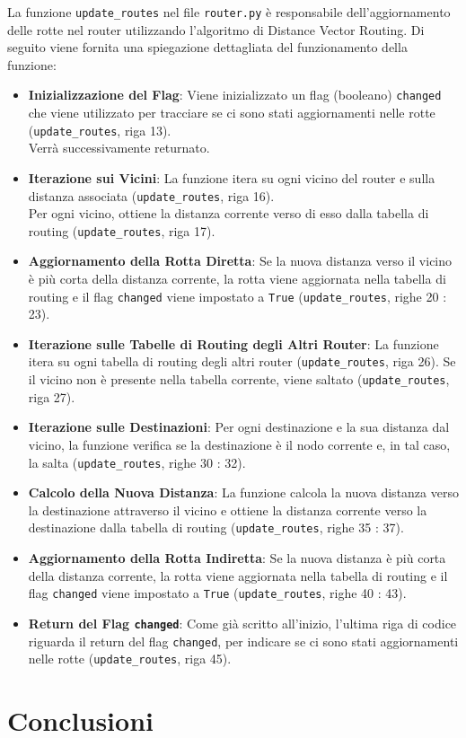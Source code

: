 \documentclass[a4paper,12pt]{report}
\begin{document}
La funzione \texttt{update\_routes} nel file \texttt{router.py} è responsabile dell'aggiornamento delle rotte nel router utilizzando l'algoritmo di Distance Vector Routing.
Di seguito viene fornita una spiegazione dettagliata del funzionamento della funzione:
\begin{itemize}
    \item \textbf{Inizializzazione del Flag}: Viene inizializzato un flag (booleano) \texttt{changed} che viene utilizzato per tracciare se ci sono stati aggiornamenti nelle rotte (\texttt{update\_routes}, riga 13). \\
    Verrà successivamente returnato.
    \item \textbf{Iterazione sui Vicini}: La funzione itera su ogni vicino del router e sulla distanza associata (\texttt{update\_routes}, riga 16). \\
    Per ogni vicino, ottiene la distanza corrente verso di esso dalla tabella di routing (\texttt{update\_routes}, riga 17).
    \item \textbf{Aggiornamento della Rotta Diretta}: Se la nuova distanza verso il vicino è più corta della distanza corrente, la rotta viene aggiornata nella tabella di routing e il flag \texttt{changed} viene impostato a \texttt{True} (\texttt{update\_routes}, righe 20 : 23).
    \item \textbf{Iterazione sulle Tabelle di Routing degli Altri Router}: La funzione itera su ogni tabella di routing degli altri router (\texttt{update\_routes}, riga 26). Se il vicino non è presente nella tabella corrente, viene saltato (\texttt{update\_routes}, riga 27).
    \item \textbf{Iterazione sulle Destinazioni}: Per ogni destinazione e la sua distanza dal vicino, la funzione verifica se la destinazione è il nodo corrente e, in tal caso, la salta (\texttt{update\_routes}, righe 30 : 32).
    \item \textbf{Calcolo della Nuova Distanza}: La funzione calcola la nuova distanza verso la destinazione attraverso il vicino e ottiene la distanza corrente verso la destinazione dalla tabella di routing (\texttt{update\_routes}, righe 35 : 37).
    \item \textbf{Aggiornamento della Rotta Indiretta}: Se la nuova distanza è più corta della distanza corrente, la rotta viene aggiornata nella tabella di routing e il flag \texttt{changed} viene impostato a \texttt{True} (\texttt{update\_routes}, righe 40 : 43).
    \item \textbf{Return del Flag \texttt{changed}}: Come già scritto all'inizio, l'ultima riga di codice riguarda il return del flag \texttt{changed}, per indicare se ci sono stati aggiornamenti nelle rotte (\texttt{update\_routes}, riga 45).
\end{itemize}

\section{Conclusioni}
\end{document}
